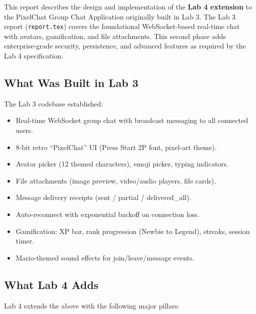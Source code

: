 \documentclass[12pt, a4paper]{article}
\begin{document}
This report describes the design and implementation of the \textbf{Lab 4 extension} to the PixelChat Group Chat Application originally built in Lab 3. The Lab 3 report (\texttt{report.tex}) covers the foundational WebSocket-based real-time chat with avatars, gamification, and file attachments. This second phase adds enterprise-grade security, persistence, and advanced features as required by the Lab 4 specification.

\subsection{What Was Built in Lab 3}

The Lab 3 codebase established:
\begin{itemize}[leftmargin=*]
    \item Real-time WebSocket group chat with broadcast messaging to all connected users.
    \item 8-bit retro ``PixelChat'' UI (Press Start 2P font, pixel-art theme).
    \item Avatar picker (12 themed characters), emoji picker, typing indicators.
    \item File attachments (image preview, video/audio players, file cards).
    \item Message delivery receipts (sent / partial / delivered\_all).
    \item Auto-reconnect with exponential backoff on connection loss.
    \item Gamification: XP bar, rank progression (Newbie to Legend), streaks, session timer.
    \item Mario-themed sound effects for join/leave/message events.
\end{itemize}

\subsection{What Lab 4 Adds}

Lab 4 extends the above with the following major pillars:
\end{document}
